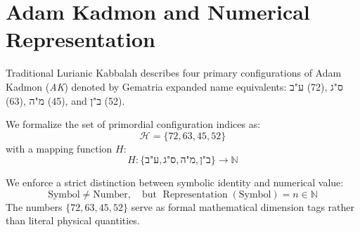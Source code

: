 \section{Adam Kadmon and Numerical Representation}
\label{sec:adam_kadmon}

Traditional Lurianic Kabbalah describes four primary configurations of Adam Kadmon (\emph{AK}) denoted by Gematria expanded name equivalents: $\text{ע"ב}$ (72), $\text{ס"ג}$ (63), $\text{מ"ה}$ (45), and $\text{ב"ן}$ (52).

\begin{definition}
We formalize the set of primordial configuration indices as:
\begin{equation}
\mathcal{H} = \{ 72, 63, 45, 52 \}
\end{equation}
with a mapping function $H$:
\begin{equation}
H : \{ \text{ע"ב}, \text{ס"ג}, \text{מ"ה}, \text{ב"ן} \} \longrightarrow \mathbb{N}
\end{equation}
\end{definition}

We enforce a strict distinction between symbolic identity and numerical value:
\begin{equation}
\text{Symbol} \neq \text{Number}, \quad \text{but } \operatorname{Representation}(\text{Symbol}) = n \in \mathbb{N}
\end{equation}
The numbers $\{72, 63, 45, 52\}$ serve as formal mathematical dimension tags rather than literal physical quantities.
